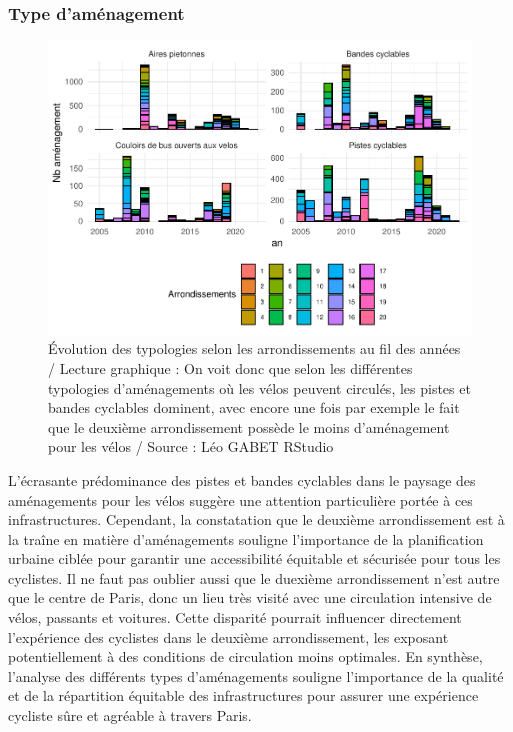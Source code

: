 \documentclass[french,]{compterendu}
\theoremstyle{urcastyle}
\theoremstyle{remark}
\begin{document}
\hypertarget{type-damuxe9nagement}{%
\subsubsection{Type d'aménagement}\label{type-damuxe9nagement}}

\begin{figure}[H]

{\centering \includegraphics[width=0.9\linewidth]{Rapport_ADD_LEO-GABET_files/figure-latex/arrPARISTypo-1} 

}

\caption{Évolution des typologies selon les arrondissements au fil des années / Lecture graphique : On voit donc que selon les différentes typologies d'aménagements où les vélos peuvent circulés, les pistes et bandes cyclables dominent, avec encore une fois par exemple le fait que le deuxième arrondissement possède le moins d'aménagement pour les vélos / Source : Léo GABET RStudio}\label{fig:arrPARISTypo}
\end{figure}

L'écrasante prédominance des pistes et bandes cyclables dans le paysage des aménagements pour les vélos suggère une attention particulière portée à ces infrastructures. Cependant, la constatation que le deuxième arrondissement est à la traîne en matière d'aménagements souligne l'importance de la planification urbaine ciblée pour garantir une accessibilité équitable et sécurisée pour tous les cyclistes. Il ne faut pas oublier aussi que le duexième arrondissement n'est autre que le centre de Paris, donc un lieu très visité avec une circulation intensive de vélos, passants et voitures.
Cette disparité pourrait influencer directement l'expérience des cyclistes dans le deuxième arrondissement, les exposant potentiellement à des conditions de circulation moins optimales.
En synthèse, l'analyse des différents types d'aménagements souligne l'importance de la qualité et de la répartition équitable des infrastructures pour assurer une expérience cycliste sûre et agréable à travers Paris.
\end{document}
